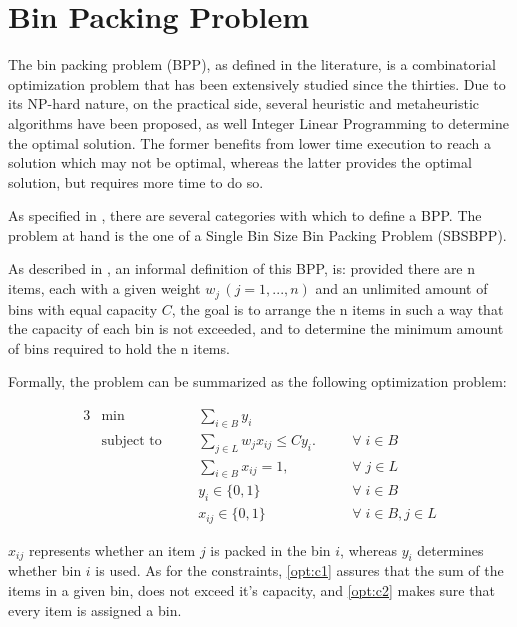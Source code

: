 \chapter{Bin Packing Problem} \label{chap:literature review}

The bin packing problem (BPP), as defined in the literature, is a combinatorial optimization problem that has been extensively studied since the thirties. Due to its NP-hard nature, on the practical side, several heuristic and metaheuristic algorithms have been proposed, as well Integer Linear Programming to determine the optimal solution. The former benefits from lower time execution to reach a solution which may not be optimal, whereas the latter provides the optimal solution, but requires more time to do so.

As specified in \cite{wascher2007improved}, there are several categories with which to define a BPP. The problem at hand is the one of a Single Bin Size Bin Packing Problem (SBSBPP).

As described in \cite{delorme2016bin}, an informal definition of this BPP, is: provided there are n items, each with a given weight \( w_j  \, (j = 1, ..., n) \) and an unlimited amount of bins with equal capacity \( C \), the goal is to arrange the n items in such a way that the capacity of each bin is not exceeded, and to determine the minimum amount of bins required to hold the n items.

Formally, the problem can be summarized as the following optimization problem:

\begin{alignat}{3}
\label{BPP model}
    &\min &&\sum_{i \in B} y_i && \\
    &\text{subject to} \quad
                && \sum_{j \in L} w_j x_{ij} \leq C y_i. \quad          && \forall \; i \in B \label{opt:c1}\\
    &           && \sum_{i \in B} x_{ij} = 1, \quad                 && \forall \; j \in L \label{opt:c2} \\
    &           && y_i \in \{0, 1\}                                 && \forall \; i \in B \\
    &           && x_{ij} \in \{0,1\}                               && \forall \; i \in B, j \in L
\end{alignat}

$x_{ij}$ represents whether an item $j$ is packed in the bin $i$, whereas $y_i$ determines whether bin $i$ is used. As for the constraints, \ref{opt:c1} assures that the sum of the items in a given bin, does not exceed it's capacity, and \ref{opt:c2} makes sure that every item is assigned a bin. 


